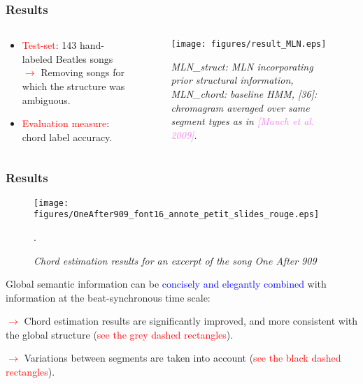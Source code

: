 \documentclass[12pt]{beamer}
\begin{document}
\begin{frame}
\frametitle{Results}


\vspace{-0.4cm}
\begin{columns}[c] 

\begin{column}{0.5\textwidth} 
\begin{itemize}

\item \textcolor{red}{Test-set}: 143 hand-labeled Beatles songs
\textcolor{red}{$\rightarrow$} Removing songs for which the structure was ambiguous.

\item \textcolor{red}{Evaluation measure}: chord label accuracy.%
\end{itemize}
\end{column} 


\begin{column}{0.5\textwidth} 
\begin{figure}[htb]
   \centering
   \texttt{[image: figures/result\_MLN.eps]}\vspace{-0.3cm}
   \caption {\footnotesize \textit{MLN\_struct: MLN incorporating prior structural information, MLN\_chord: baseline HMM, [36]: chromagram averaged over same segment types as in \textcolor{violet}{[Mauch \textit{et al.} 2009]}.}}
\end{figure}

\end{column} 
\end{columns} 
\medskip
\end{frame} 

\begin{frame} 
\frametitle{Results}
\vspace{-0.6cm}
\begin{figure}[htb]
   \centering
   \texttt{[image: figures/OneAfter909\_font16\_annote\_petit\_slides\_rouge.eps]}
   \vspace{-0.4cm}
   \caption {\footnotesize \textit{Chord estimation results for an excerpt of the song One After 909}}.
\end{figure}

\vspace{-0.7cm}
Global semantic information can be \textcolor{blue}{concisely and elegantly combined} with information at the beat-synchronous time scale: 

\textcolor{red}{$\rightarrow$} Chord estimation results are significantly improved, and more consistent with the global structure (\textcolor{red}{see the grey dashed rectangles}).

\textcolor{red}{$\rightarrow$} Variations between segments are taken into account (\textcolor{red}{see the black dashed rectangles}).

\end{frame}
\end{document}
